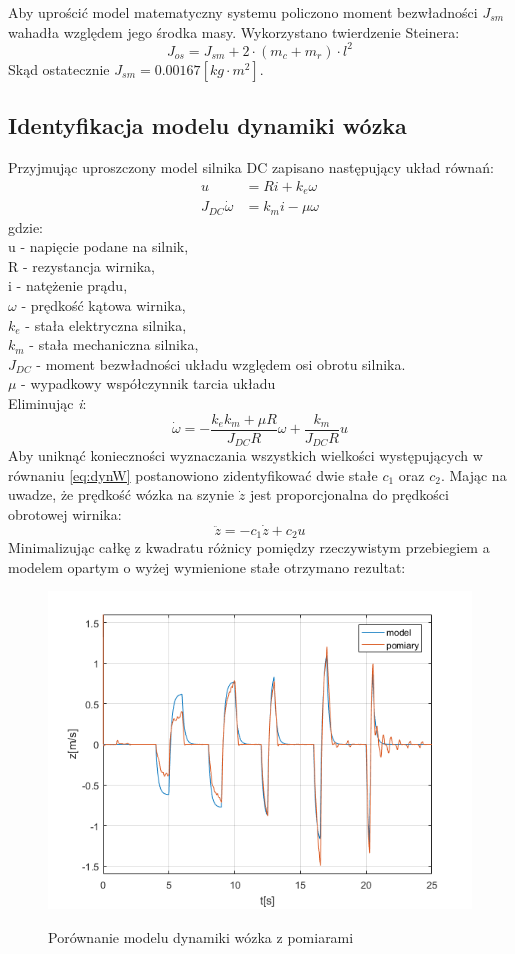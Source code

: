 Aby uprościć model matematyczny systemu policzono moment bezwładności $J_{sm}$ wahadła względem jego środka masy. Wykorzystano twierdzenie Steinera:
\begin{equation}
J_{os} = J_{sm} + 2\cdot(m_c+m_r)\cdot l^2
\end{equation}
Skąd ostatecznie $J_{sm} = 0.00167[kg \cdot m^2]$.
\subsection{Identyfikacja modelu dynamiki wózka}
Przyjmując uproszczony model silnika DC zapisano następujący układ równań:
\begin{align}
u &= Ri + k_e\omega \\
J_{DC}\dot{\omega} &= k_mi - \mu\omega
\end{align}
gdzie:\\
u - napięcie podane na silnik,\\
R - rezystancja wirnika,\\
i - natężenie prądu,\\
$\omega$ - prędkość kątowa wirnika,\\
$k_e$ - stała elektryczna silnika,\\
$k_m$ - stała mechaniczna silnika,\\
$J_{DC}$ - moment bezwładności układu względem osi obrotu silnika.\\
$\mu$ - wypadkowy współczynnik tarcia układu\\
Eliminując \textit{i}:
\begin{equation}
\label{eq:dynW}
\dot{\omega}=-\frac{k_ek_m+\mu R}{J_{DC}R}\omega+\frac{k_m}{J_{DC}R}u
\end{equation}
Aby uniknąć konieczności wyznaczania wszystkich wielkości występujących w równaniu \ref{eq:dynW} postanowiono zidentyfikować dwie stałe $c_1$ oraz $c_2$. Mając na uwadze, że prędkość wózka na szynie $\dot{z}$ jest proporcjonalna do prędkości obrotowej wirnika:
\begin{equation}
\label{eq:zz}
\ddot{z}=-c_1\dot{z}+c_2u
\end{equation}
Minimalizując całkę z kwadratu różnicy pomiędzy rzeczywistym przebiegiem a modelem opartym o wyżej wymienione stałe otrzymano rezultat:
\begin{figure}[H]
\centering
\includegraphics[width=12cm]{obrazy/pr_woz.png}
\label{fig:wozek}
\caption{Porównanie modelu dynamiki wózka z pomiarami}
\end{figure}
